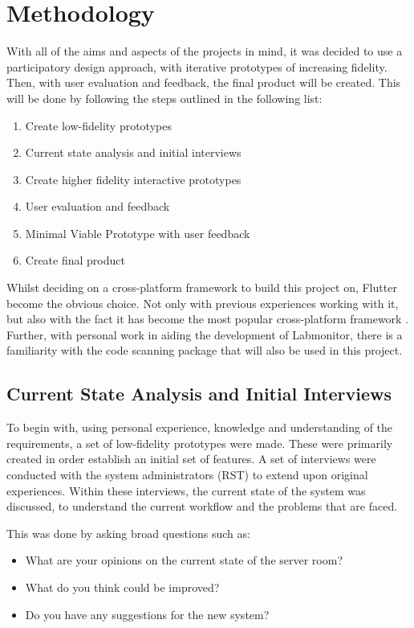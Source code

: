 \documentclass [11pt,a4paper]{article}
\begin{document}
\section{Methodology}
\label{sec:methodology}
With all of the aims and aspects of the projects in mind, it was decided to use a participatory design approach, with iterative prototypes of increasing fidelity. Then, with user evaluation and feedback, the final product will be created. This will be done by following the steps outlined in the following list:

\begin{enumerate}
    \item Create low-fidelity prototypes
    \item Current state analysis and initial interviews
    \item Create higher fidelity interactive prototypes
    \item User evaluation and feedback
    \item Minimal Viable Prototype with user feedback
    \item Create final product
\end{enumerate}

Whilst deciding on a cross-platform framework to build this project on, Flutter become the obvious choice. Not only with previous experiences working with it, but also with the fact it has become the most popular cross-platform framework \cite{JetBrainsFlutter}. Further, with personal work in aiding the development of Labmonitor\cite{labmonitor}, there is a familiarity with the code scanning package that will also be used in this project\cite{barcodeScannerPlugin}.

\subsection{Current State Analysis and Initial Interviews}
\label{sec:current_state_analysis}
To begin with, using personal experience, knowledge and  understanding of the requirements, a set of low-fidelity prototypes were made. These were primarily created in order establish an initial set of features. A set of interviews were conducted with the system administrators (RST) to extend upon original experiences.  Within these interviews, the current state of the system was discussed, to understand the current workflow and the problems that are faced.

This was done by asking broad questions such as:

\begin{itemize}
    \item What are your opinions on the current state of the server room?
    \item What do you think could be improved?
    \item Do you have any suggestions for the new system?
\end{itemize}
\end{document}
